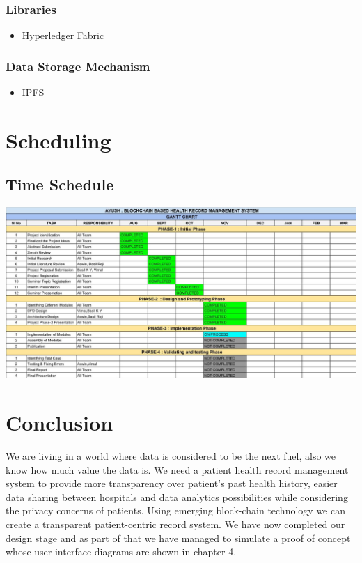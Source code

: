 \documentclass[11pt]{report}
\begin{document}
                 \subsection{Libraries}       
                                \begin{itemize}
                                    \item Hyperledger Fabric
                                \end{itemize}
                \subsection{Data Storage Mechanism}     
                                \begin{itemize}
                                    \item IPFS
                                \end{itemize}
                    
\chapter{Scheduling}
\section{Time Schedule}
\includegraphics[width=15cm]{Chart.jpeg}\newline
\chapter{Conclusion}
           We are living in a world where data is considered to be the next fuel, also we know how much
value the data is.  We need a patient health record management system to provide more transparency over patient’s past health history, easier data sharing between hospitals and data analytics possibilities while considering the privacy concerns of patients. Using emerging block-chain technology we can create a transparent patient-centric record system. We have now completed our design stage and as part of that we have managed to simulate a proof of concept whose user interface diagrams are shown in chapter 4. 
\end{document}
